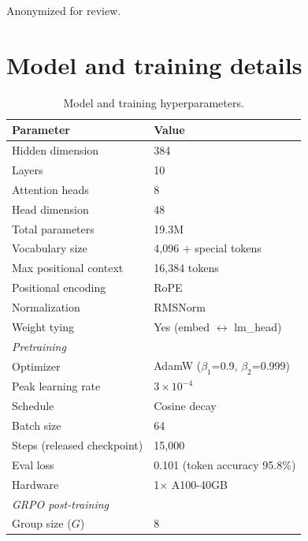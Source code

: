 \documentclass{article}
\begin{document}
\begin{ack}
  Anonymized for review.
\end{ack}





\appendix

\section{Model and training details}
\label{app:model}

\begin{table}[h]
  \caption{Model and training hyperparameters.}
  \label{tab:hyperparams}
  \centering
  \begin{tabular}{ll}
    \toprule
    Parameter & Value \\
    \midrule
    Hidden dimension & 384 \\
    Layers & 10 \\
    Attention heads & 8 \\
    Head dimension & 48 \\
    Total parameters & 19.3M \\
    Vocabulary size & 4,096 + special tokens \\
    Max positional context & 16,384 tokens \\
    Positional encoding & RoPE \\
    Normalization & RMSNorm \\
    Weight tying & Yes (embed $\leftrightarrow$ lm\_head) \\
    \midrule
    \multicolumn{2}{l}{\textit{Pretraining}} \\
    \midrule
    Optimizer & AdamW ($\beta_1$=0.9, $\beta_2$=0.999) \\
    Peak learning rate & $3 \times 10^{-4}$ \\
    Schedule & Cosine decay \\
    Batch size & 64 \\
    Steps (released checkpoint) & 15,000 \\
    Eval loss & 0.101 (token accuracy 95.8\%) \\
    Hardware & 1$\times$ A100-40GB \\
    \midrule
    \multicolumn{2}{l}{\textit{GRPO post-training}} \\
    \midrule
    Group size ($G$) & 8 \\

\end{tabular}
\end{table}
\end{document}
